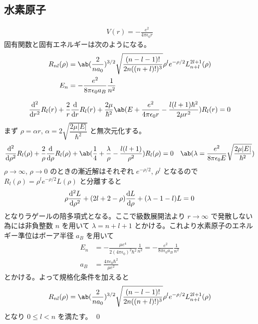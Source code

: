 \documentclass[uplatex,dvipdfmx,a4paper,11pt]{jlreq}
\makeatletter
\numberwithin{equation}{section}
\theoremstyle{definition}
\renewenvironment{proof}[1][\proofname]{\par
  \normalfont
  \topsep6\p@\@plus6\p@ \trivlist
  \item[\hskip\labelsep{\bfseries #1}\@addpunct{\bfseries}]\ignorespaces\quad\par
}{%
  \qed\endtrivlist\@endpefalse
}
\renewcommand\proofname{証明}
\makeatother
\begin{document}
\subsection{水素原子}
\begin{proposition}
  \begin{align}
    V(r) = -\frac{e^2}{4\pi\epsilon_0r}
  \end{align}
  固有関数と固有エネルギーは次のようになる。
  \begin{align}
    R_{nl}(\rho) & = \ab(\frac{2}{na_0})^{3/2}\sqrt{\frac{(n-l-1)!}{2n((n+l)!)^3}}\rho^le^{-\rho/2}L_{n+l}^{2l+1}(\rho) \\
    E_n          & = - \frac{e^2}{8\pi\epsilon_0a_B}\frac{1}{n^2}
  \end{align}
\end{proposition}
\begin{proof}
  \begin{align}
    \dv[2]{r}R_l(r) + \frac{2}{r}\dv{r}R_l(r) + \frac{2\mu}{\hbar^2}\ab(E + \frac{e^2}{4\pi\epsilon_0r} - \frac{l(l+1)\hbar^2}{2\mu r^2})R_l(r) = 0
  \end{align}
  まず $\rho = \alpha r$, $\alpha = 2\sqrt{\dfrac{2\mu|E|}{\hbar^2}}$ と無次元化する。
  \begin{align}
    \dv[2]{\rho}R_l(\rho) + \frac{2}{\rho}\dv{\rho}R_l(\rho) + \ab(\frac{1}{4} + \frac{\lambda}{\rho} - \frac{l(l+1)}{\rho^2})R_l(\rho) & = 0 & \ab(\lambda = \frac{e^2}{8\pi\epsilon_0E}\sqrt{\dfrac{2\mu|E|}{\hbar^2}})
  \end{align}
  $\rho\to\infty$, $\rho\to 0$ のときの漸近解はそれぞれ $e^{-\rho/2}$, $\rho^l$ となるので $R_l(\rho) = \rho^le^{-\rho/2}L(\rho)$ と分離すると
  \begin{align}
    \rho\dv[2]{L}{\rho} + (2l + 2 - \rho)\dv{L}{\rho} + (\lambda - 1 - l)L = 0
  \end{align}
  となりラゲールの陪多項式となる。ここで級数展開法より $r\to\infty$ で発散しない為には非負整数 $n$ を用いて $\lambda = n + l + 1$ とかける。これより水素原子のエネルギー準位はボーア半径 $a_B$ を用いて
  \begin{align}
    E_n & = - \frac{\mu e^4}{2(4\pi\epsilon_0)^2\hbar^2}\frac{1}{n^2} =  - \frac{e^2}{8\pi\epsilon_0a_B}\frac{1}{n^2} \\
    a_B & = \frac{4\pi\epsilon_0\hbar^2}{\mu e^2}
  \end{align}
  とかける。よって規格化条件を加えると
  \begin{align}
    R_{nl}(\rho) = \ab(\frac{2}{na_0})^{3/2}\sqrt{\frac{(n-l-1)!}{2n((n+l)!)^3}}\rho^le^{-\rho/2}L_{n+l}^{2l+1}(\rho)
  \end{align}
  となり $0\leq l < n$ を満たす。
\end{proof}
\end{document}

